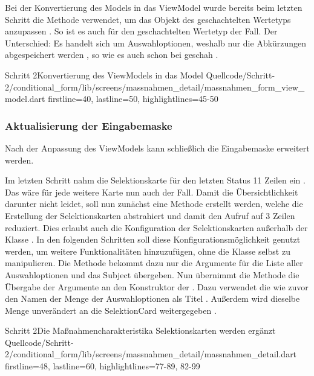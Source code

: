 Bei der Konvertierung des Models in das ViewModel wurde bereits beim letzten Schritt die Methode  verwendet, um das Objekt des geschachtelten Wertetyps  anzupassen . So ist es auch für den geschachtelten Wertetyp  der Fall. Der Unterschied: Es handelt sich um Auswahloptionen, weshalb nur die Abkürzungen abgespeichert werden , so wie es auch schon bei  geschah .

\begin{alexlisting}{Schritt 2}{Konvertierung des ViewModels in das Model}
  {Quellcode/Schritt-2/conditional_form/lib/screens/massnahmen_detail/massnahmen_form_view_model.dart}
  {firstline=40, lastline=50, highlightlines={45-50}}
  \label{lst:Schritt2KonvertierungDesViewModelsInDasModel}
\end{alexlisting}

\subsubsection{Aktualisierung der Eingabemaske}

Nach der Anpassung des ViewModels kann schließlich die Eingabemaske erweitert werden.

Im letzten Schritt nahm die Selektionskarte für den letzten Status 11 Zeilen ein . 
Das wäre für jede weitere Karte nun auch der Fall.
Damit die Übersichtlichkeit darunter nicht leidet, soll nun zunächst eine Methode erstellt werden, welche die Erstellung der Selektionskarten abstrahiert und damit den Aufruf auf 3 Zeilen reduziert.
Dies erlaubt auch die Konfiguration der Selektionskarten außerhalb der Klasse .
In den folgenden Schritten soll diese Konfigurationsmöglichkeit genutzt werden, um weitere Funktionalitäten hinzuzufügen, ohne die Klasse selbst zu manipulieren.
Die Methode  bekommt dazu nur die Argumente für die Liste aller Auswahloptionen   und das Subject   übergeben.
Nun übernimmt die Methode die Übergabe der Argumente an den Konstruktor der .
Dazu verwendet die  wie zuvor den Namen der Menge der Auswahloptionen als Titel .
Außerdem wird dieselbe Menge unverändert an die SelektionCard weitergegeben .

\begin{alexlisting}{Schritt 2}{Die Maßnahmencharakteristika Selektionskarten werden ergänzt}
  {Quellcode/Schritt-2/conditional_form/lib/screens/massnahmen_detail/massnahmen_detail.dart}
  {firstline=48, lastline=60, highlightlines={77-89, 82-99}}
  \label{lst:Schritt2MassnahmencharakteristikaSelektionskartenWerdenErgaenzt}
\end{alexlisting}

